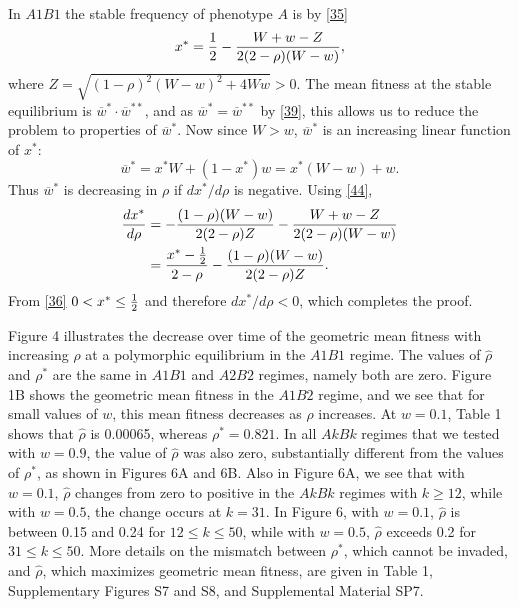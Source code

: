 \documentclass[9pt,twocolumn,twoside,lineno]{pnas-new}
\newcommand{\an}[1]{\begin{align}#1\end{align}}
\begin{document}
 In $A1B1$ the stable frequency of phenotype $A$ is by \eqref{35}
\begin{equation}
x^* ={1\over 2} -{W+w-Z\over 2(2-\rho)(W-w)},
\label{44}\end{equation}
where $Z =\sqrt{(1-\rho)^2(W-w)^2 +4Ww}>0$.   The mean fitness at the stable equilibrium  is $\overline w^*\cdot\overline w^{**}$, and as $\overline w^* =\overline w^{**}$  by  \eqref{39}, this allows us to reduce the problem to properties of $\overline w^*$.  Now since $W>w$,  $\overline w^*$ is an increasing linear function of $x^*$:
\begin{equation}
\overline w^* =x^*W +(1-x^*)w = x^*(W-w) +w.
\label{45}\end{equation}
Thus $\overline w^*$ is decreasing in $\rho$ if $dx^*/d\rho$ is negative. Using \eqref{44},
\begin{equation}
\an{
{dx^*\over d\rho} &=- {(1-\rho)(W-w)\over 2(2-\rho)Z} -{W+w-Z\over 2(2-\rho)(W-w)}\\
& = {x^*-{1\over 2}\over 2-\rho} -{(1-\rho)(W-w)\over 2(2-\rho)Z}.}
\label{46}\end{equation}
From \eqref{36} $0<x^*\le{1\over 2}$ and therefore $dx^*/d\rho <0$, which completes the proof.

  Figure 4 illustrates the decrease over time of the geometric mean fitness with increasing $\rho$ at a polymorphic equilibrium in the $A1B1$ regime. The values of $\hat\rho$ and $\rho^*$ are the same in $A1B1$ and $A2B2$ regimes, namely both are zero.  Figure 1B shows the geometric mean fitness in the $A1B2$ regime, and we see that for small values of $w$, this mean fitness decreases as $\rho$ increases. At $w=0.1$, Table 1 shows that $\hat\rho$ is 0.00065, whereas $\rho^*=0.821$.  In all $AkBk$ regimes that we tested with $w=0.9$, the value of $\hat\rho$ was also zero, substantially different from the values of $\rho^*$, as shown in Figures 6A and 6B. Also in Figure 6A, we see that with $w=0.1$, $\hat\rho$ changes from zero to positive in the $AkBk$ regimes with $k \ge 12$, while with $w=0.5$, the change occurs at $k=31$.
 In Figure 6, with $w=0.1$, $\hat\rho$ is between 0.15 and 0.24 for $12\le k\le 50$, while with $w=0.5$, $\hat\rho$ exceeds 0.2 for $31\le k\le 50$.  More details on the mismatch between $\rho^*$, which cannot be invaded, and $\hat\rho$, which maximizes geometric mean fitness, are given in Table 1, Supplementary Figures S7 and S8, and Supplemental Material SP7.
\end{document}
